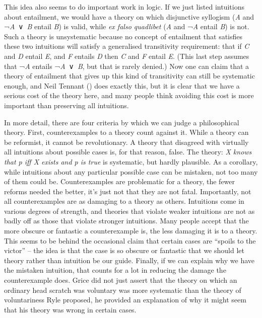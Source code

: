\documentclass[
  10pt,
  letterpaper,
  DIV=11,
  numbers=noendperiod,
  twoside]{scrartcl}
\begin{document}
This idea also seems to do important work in logic. If we just listed
intuitions about entailment, we would have a theory on which disjunctive
syllogism (\emph{A} and ¬\emph{A}~∨~\emph{B} entail \emph{B}) is valid,
while \emph{ex falso quadlibet} (\emph{A} and ¬\emph{A} entail \emph{B})
is not. Such a theory is unsystematic because no concept of entailment
that satisfies these two intuitions will satisfy a generalised
transitivity requirement: that if \emph{C} and \emph{D} entail \emph{E},
and \emph{F} entails \emph{D} then \emph{C} and \emph{F} entail
\emph{E}. (This last step assumes that ¬\emph{A} entails
¬\emph{A}~∨~\emph{B}, but that is rarely denied.) Now one can claim that
a theory of entailment that gives up this kind of transitivity can still
be systematic enough, and Neil Tennant
() does exactly this, but it is clear
that we have a serious cost of the theory here, and many people think
avoiding this cost is more important than preserving all intuitions.

In more detail, there are four criteria by which we can judge a
philosophical theory. First, counterexamples to a theory count against
it. While a theory can be reformist, it cannot be revolutionary. A
theory that disagreed with virtually all intuitions about possible cases
is, for that reason, false. The theory: \emph{X knows that p iff X
exists and p is true} is systematic, but hardly plausible. As a
corollary, while intuitions about any particular possible case can be
mistaken, not too many of them could be. Counterexamples are problematic
for a theory, the fewer reforms needed the better, it's just not that
they are not fatal. Importantly, not all counterexamples are as damaging
to a theory as others. Intuitions come in various degrees of strength,
and theories that violate weaker intuitions are not as badly off as
those that violate stronger intuitions. Many people accept that the more
obscure or fantastic a counterexample is, the less damaging it is to a
theory. This seems to be behind the occasional claim that certain cases
are ``spoils to the victor'' -- the idea is that the case is so obscure
or fantastic that we should let theory rather than intuition be our
guide. Finally, if we can explain why we have the mistaken intuition,
that counts for a lot in reducing the damage the counterexample does.
Grice did not just assert that the theory on which an ordinary head
scratch was voluntary was more systematic than the theory of
voluntariness Ryle proposed, he provided an explanation of why it might
seem that his theory was wrong in certain cases.
\end{document}
